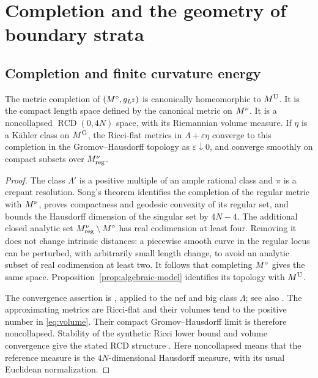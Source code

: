 \section{Completion and the geometry of boundary strata}\label{sec:geometry}

\subsection{Completion and finite curvature energy}

\begin{theorem}\label{thm:completion}
The metric completion of $(M^{\circ},g_{L^2})$ is canonically homeomorphic to $M^{\mathrm U}$.
It is the compact length space defined by the canonical metric on $M^{\nu}$.
It is a noncollapsed $\operatorname{RCD}(0,4N)$ space, with its Riemannian
volume measure. If $\eta$ is a K\"ahler class on $M^{\mathrm G}$, the Ricci-flat
metrics in $\Lambda+\varepsilon\eta$ converge to this completion in the
Gromov--Hausdorff topology as $\varepsilon\downarrow0$, and converge
smoothly on compact subsets over $M^{\nu}_{\rm reg}$.
\end{theorem}
\begin{proof}
The class $\Lambda'$ is a positive multiple of an ample rational class and
$\pi$ is a crepant resolution. Song's theorem
\cite[Theorem~1.1 and Corollary~1.1]{Song14} identifies the completion of
the regular metric with $M^{\nu}$, proves compactness and geodesic convexity
of its regular set, and bounds the Hausdorff dimension of the singular
set by $4N-4$. The additional closed analytic set
$M^{\nu}_{\rm reg}\setminus M^{\circ}$ has real codimension at least four.
Removing it does not change intrinsic distances: a piecewise smooth curve
in the regular locus can be perturbed, with arbitrarily small length
change, to avoid an analytic subset of real codimension at least two.
It follows that completing $M^{\circ}$ gives the same space.
Proposition~\ref{prop:algebraic-model} identifies its topology with $M^{\mathrm U}$.

The convergence assertion is
\cite[Theorem~1.6]{CT15}, applied to the nef and big class $\Lambda$;
see also \cite[Theorems~1.1--1.2]{RZ11}.
The approximating metrics are Ricci-flat and their volumes tend to the
positive number in \eqref{eq:volume}. Their compact Gromov--Hausdorff limit
is therefore noncollapsed. Stability of the synthetic Ricci lower bound
and volume convergence give the stated RCD structure
\cite{DPG18}. Here noncollapsed means that the reference measure is the
$4N$-dimensional Hausdorff measure, with its usual Euclidean normalization.
\end{proof}

